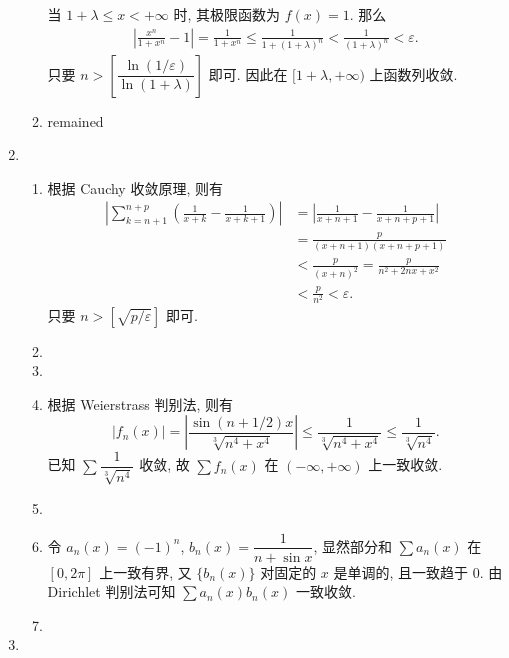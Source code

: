 \documentclass[a4paper, 11pt]{ctexart}
\begin{document}
\begin{enumerate}
\begin{enumerate}[(1)]
                当 $1+\lambda \leq x < +\infty$ 时, 其极限函数为 $f(x) = 1$. 那么
                \begin{align*}
                    \left|\frac{x^n}{1+x^n} - 1\right| = \frac{1}{1+x^n} \leq \frac{1}{1+(1+\lambda)^n} < \frac{1}{(1+\lambda)^n} < \varepsilon.
                \end{align*}
                只要 $n > \left[\dfrac{\ln(1/\varepsilon)}{\ln(1+\lambda)}\right]$ 即可. 因此在 $[1+\lambda, +\infty)$ 上函数列收敛.
            \item %
                {\color{red}remained}
        \end{enumerate}
    \item %
        \begin{enumerate}[(1)]
            \item %
                根据 Cauchy 收敛原理, 则有
                \begin{align*}
                    \left| \sum_{k=n+1}^{n+p}\left(\frac{1}{x+k} - \frac{1}{x+k+1}\right) \right| &= \left|\frac{1}{x+n+1} - \frac{1}{x+n+p+1}\right| \\
                    &= \frac{p}{(x+n+1)(x+n+p+1)} \\
                    &< \frac{p}{(x+n)^2} = \frac{p}{n^2 + 2nx + x^2} \\
                    &< \frac{p}{n^2} < \varepsilon.
                \end{align*}
                只要 $n > [\sqrt{p/\varepsilon}]$ 即可.
            \item %
            \item %
            \item %
                根据 Weierstrass 判别法, 则有
                \[
                    |f_n(x)| = \left| \frac{\sin(n+1/2)x}{\sqrt[3]{n^4+x^4}} \right| \leq \frac{1}{\sqrt[3]{n^4+x^4}} \leq \frac{1}{\sqrt[3]{n^4}}.    
                \]
                已知 $\sum\dfrac{1}{\sqrt[3]{n^4}}$ 收敛, 故 $\sum{f_n(x)}$ 在 $(-\infty, +\infty)$ 上一致收敛.
            \item %
            \item %
                令 $a_n(x) = (-1)^n$, $b_n(x) = \dfrac{1}{n+\sin{x}}$, 显然部分和 $\sum{a_n(x)}$ 在 $[0, 2\pi]$ 上一致有界,
                又 $\{b_n(x)\}$ 对固定的 $x$ 是单调的, 且一致趋于 $0$. 由 Dirichlet 判别法可知 $\sum{a_n(x)b_n(x)}$ 一致收敛.
            \item %
        \end{enumerate}
    \item %

\end{enumerate}
\end{document}
